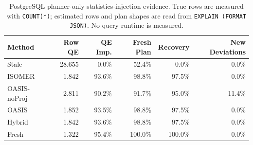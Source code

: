 \begin{table}[t]
  \centering
  \small
  \caption{PostgreSQL planner-only statistics-injection evidence. True rows are measured with \texttt{COUNT(*)}; estimated rows and plan shapes are read from \texttt{EXPLAIN (FORMAT JSON)}. No query runtime is measured.}
  \label{tab:postgres_planner_stats_injection}
  \setlength{\tabcolsep}{4pt}
  \begin{tabular}{lrrrrr}
    \toprule
    Method & Row QE & QE Imp. & Fresh Plan & Recovery & New Deviations \\
    \midrule
    Stale & 28.655 & 0.0\% & 52.4\% & 0.0\% & 0.0\% \\
    ISOMER & 1.842 & 93.6\% & 98.8\% & 97.5\% & 0.0\% \\
    OASIS-noProj & 2.811 & 90.2\% & 91.7\% & 95.0\% & 11.4\% \\
    OASIS & 1.852 & 93.5\% & 98.8\% & 97.5\% & 0.0\% \\
    Hybrid & 1.842 & 93.6\% & 98.8\% & 97.5\% & 0.0\% \\
    Fresh & 1.322 & 95.4\% & 100.0\% & 100.0\% & 0.0\% \\
    \bottomrule
  \end{tabular}
\end{table}
